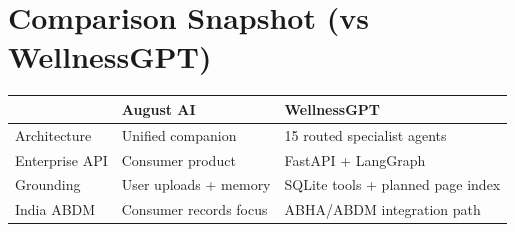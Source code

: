 \documentclass[12pt,a4paper]{article}
\begin{document}
\section{Comparison Snapshot (vs WellnessGPT)}
\begin{table}[h]
\centering
\renewcommand{\arraystretch}{1.4}
\begin{tabularx}{\textwidth}{lXX}
\toprule
 & \textbf{August AI} & \textbf{WellnessGPT} \\
\midrule
Architecture & Unified companion & 15 routed specialist agents \\
Enterprise API & Consumer product & FastAPI + LangGraph \\
Grounding & User uploads + memory & SQLite tools + planned page index \\
India ABDM & Consumer records focus & ABHA/ABDM integration path \\
\bottomrule
\end{tabularx}
\end{table}
\end{document}

